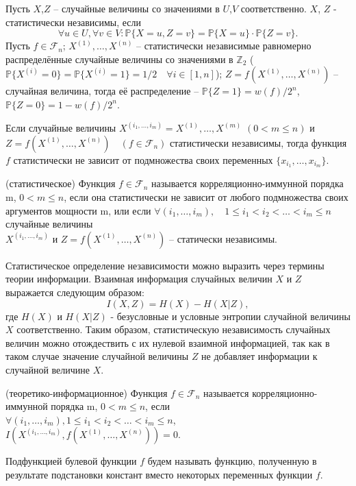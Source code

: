 Пусть $X$,$Z$ – случайные величины со значениями в $U$,$V$ соответственно. $X$, $Z$ - статистически независимы, если
\[
\forall u \in U, \forall v \in V: \mathbb{P}\{X = u, Z = v\} = \mathbb{P}\{X = u\} \cdot \mathbb{P}\{Z = v\}.
\]
Пусть $f \in \mathcal{F}_n$; $X^{(1)},\dots,X^{(n)}$ – статистически независимые равномерно распределённые случайные величины со значениями в $\mathbb{Z}_2$ ($\mathbb{P}\{X^{(i)} = 0\} = \mathbb{P}\{X^{(i)} = 1\} = 1/2 \quad \forall i \in [1,n]$); $Z = f(X^{(1)},\dots,X^{(n)})$ – случайная величина, тогда её распределение – $\mathbb{P}\{Z = 1\} = w(f)/2^n$, $\mathbb{P}\{Z = 0\} = 1 - w(f)/2^n$.
\begin{definition}
    Если случайные величины $X^{(i_1,\dots,i_m)} = X^{(1)},\dots,X^{(m)}$ $(0 < m \leq n)$ и $Z = f(X^{(1)},\dots,X^{(n)}) \quad (f \in \mathcal{F}_n)$ статистически независимы, тогда функция $f$ статистически не зависит от подмножества своих переменных $\{x_{i_1}, \dots, x_{i_m}\}$.
\end{definition}
\begin{definition}(статистическое)
Функция $f \in \mathcal{F}_n$ называется корреляционно-иммунной порядка m, $0 < m \leq n$, если она статистически не зависит от любого подмножества своих аргументов мощности m, или если $\forall (i_1,\dots, i_m), \quad 1 \leq i_1 < i_2< \dots < i_m \leq n $ случайные величины $ X^{(i_1,\dots,i_m)} \text{ и } Z = f(X^{(1)},\dots,X^{(n)}) \text{ – статически независимы}$.
\label{cor_imm_stat}
\end{definition}
Статистическое определение независимости можно выразить через термины теории информации. Взаимная информация случайных величин $X$ и $Z$ выражается следующим образом:
\[
    I(X,Z) = H(X) - H(X|Z),
\]
    где $H(X)$ и $H(X|Z)$ - безусловные и условные энтропии случайной величины $X$ соответственно. Таким образом, статистическую независимость случайных величин можно отождествить с их нулевой взаимной информацией, так как в таком случае значение случайной величины $Z$ не добавляет информации к случайной величине $X$.
\begin{definition}(теоретико-информационное)
Функция $f \in \mathcal{F}_n$ называется корреляционно-иммунной порядка m, $0 < m \leq n$, если \\ $\forall (i_1,\dots, i_m), 
1 \leq i_1 < i_2< \dots < i_m \leq n $, $I(X^{(i_1,\dots,i_m)},f(X^{(1)},\dots,X^{(n)})) = 0$.
\label{cor_imm_theor_inf}
\end{definition}    

Подфункцией булевой функции $f$ будем называть функцию, полученную в результате подстановки констант вместо некоторых переменных функции $f$.

